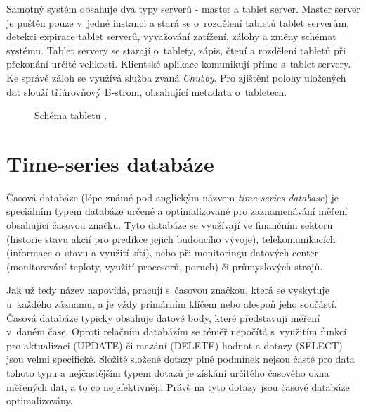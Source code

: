 Samotný systém obsahuje dva typy serverů - master a tablet server. Master server je puštěn pouze v~jedné instanci a stará se o~rozdělení tabletů tablet serverům, detekci expirace tablet serverů, vyvažování zatížení, zálohy a změny schémat systému. Tablet servery se starají o~tablety, zápis, čtení a rozdělení tabletů při překonání určité velikosti. Klientské aplikace komunikují přímo s~tablet servery. Ke správě záloh se využívá služba zvaná \textit{Chubby}. Pro zjištění polohy uložených dat slouží tříúrovňový B-strom, obsahující metadata o~tabletech. 

\begin{figure}[h]
  \centering
  \caption{Schéma tabletu \cite{BigTableTablet}.}\label{pic:tablet}
\end{figure}

\section{Time-series databáze}
Časová databáze (lépe známé pod anglickým názvem \textit{time-series database}) je speciálním typem databáze určené a optimalizované pro zaznamenávání měření obsahující časovou značku. Tyto databáze se využívají ve finančním sektoru (historie stavu akcií pro predikce jejich budoucího vývoje), telekomunikacích (informace o~stavu a využití sítí), nebo při monitoringu datových center (monitorování teploty, využití procesorů, poruch) či průmyslových strojů.

Jak už tedy název napovídá, pracují s~časovou značkou, která se vyskytuje u~každého záznamu, a je vždy primárním klíčem nebo alespoň jeho součástí. Časová databáze typicky obsahuje datové body, které představují měření v~daném čase.  Oproti relačním databázím se téměř nepočítá s~využitím funkcí pro aktualizaci (UPDATE) či mazání (DELETE) hodnot a dotazy (SELECT) jsou velmi specifické. Složité složené dotazy plné podmínek nejsou časté pro data tohoto typu a nejčastějším typem dotazů je získání určitého časového okna měřených dat, a to co nejefektivněji. Právě na tyto dotazy jsou časové databáze optimalizovány\cite{time-series-paper}. 

